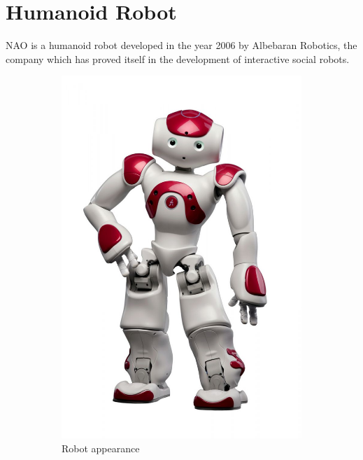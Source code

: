 \section{Humanoid Robot}
NAO \cite{NaoTheRobot} is a humanoid robot developed in the year 2006 by Albebaran Robotics, the company which has proved itself in the development of interactive social robots.
\begin{figure}[H]
\centering
\begin{subfigure}[b]{0.25\textwidth}
\includegraphics[width=\textwidth]{assets/nao_image1.jpg}
\caption{Robot appearance}
\label{fig:naojoint}
\end{subfigure}
\begin{subfigure}[b]{0.25\textwidth}

\end{subfigure}
\end{figure}
